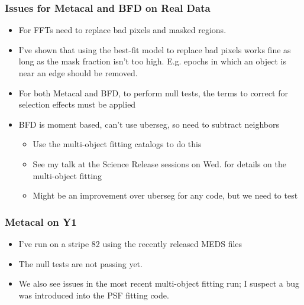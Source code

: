\documentclass{beamer}
\begin{document}
\frame
{
    \frametitle{Issues for Metacal and BFD on Real Data}

 
    \begin{itemize}

        \item For FFTs need to replace bad pixels and masked regions.
            

        \item I've shown that using the best-fit model to replace bad pixels
            works fine as long as
            the mask fraction isn't too high. E.g. epochs in which
            an object is near an edge should be removed.

        
        \item For both Metacal and BFD, to perform null tests, the terms to correct for selection effects
            must be applied

        \item BFD is moment based, can't use uberseg, so need to subtract neighbors
            \begin{itemize}
                \item Use the multi-object fitting catalogs to do this
                \item See my talk at the Science Release sessions on Wed. for details
                    on the multi-object fitting
                \item Might be an improvement over uberseg for any code, but we need
                    to test
            \end{itemize}

    \end{itemize}

}

\frame
{
    \frametitle{Metacal on Y1}

 
    \begin{itemize}

        \item I've run on a stripe 82 using the recently released MEDS files

        \item The null tests are not passing yet.
            
        \item We also see issues in the most recent multi-object fitting run; I
            suspect a bug was introduced into the PSF fitting code.

    \end{itemize}

}
\end{document}
